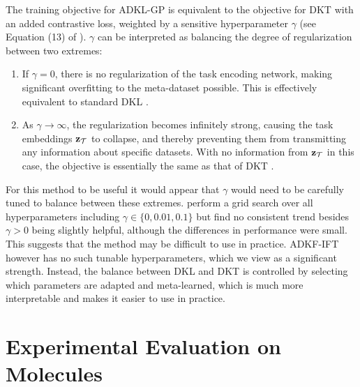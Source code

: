     The training objective for 
    ADKL-GP
    is equivalent to the objective for DKT
    with an added contrastive loss, weighted by a sensitive hyperparameter $\gamma$
    (see Equation (13) of \citet{tossou2019adaptive}).
    $\gamma$ can be interpreted as balancing the degree of regularization between two extremes:
    \begin{enumerate}
        \item If $\gamma=0$, there is no regularization of the task encoding network,
        making significant overfitting to the meta-dataset possible.
        This is effectively equivalent to standard DKL \citep{wilson2016deep}.
        \item As $\gamma\to\infty$,
        the regularization becomes infinitely strong,
        causing the task embeddings $\operatorname{\mathbf{z}}_{\operatorname{\mathcal{T}}}$ to collapse,
        and thereby preventing them from transmitting any information about specific datasets.
        With no information from $\operatorname{\mathbf{z}}_{\operatorname{\mathcal{T}}}$ in this case,
        the objective is essentially the same as that of DKT \citep{Patacchiola20}.
    \end{enumerate}
    For this method to be useful it would appear that $\gamma$ would need to be carefully tuned to balance between these extremes.
    \citet{tossou2019adaptive} perform a grid search over all hyperparameters including $\gamma\in\{0, 0.01, 0.1\}$
    but find no consistent trend besides $\gamma>0$ being slightly helpful,
    although the differences in performance were small.
    This suggests that the method may be difficult to use in practice.
    ADKF-IFT however has no such tunable hyperparameters,
    which we view as a significant strength.
    Instead, the balance between DKL and DKT is controlled by selecting which
    parameters are adapted and meta-learned,
    which is much more interpretable and makes it easier to use in practice.
    

\section{Experimental Evaluation on Molecules}\label{sec:adkf:experiments}

